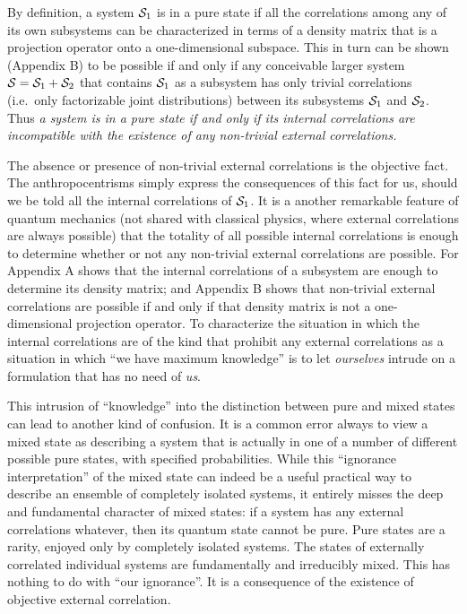 By definition, a system ${\cal S}_1$ is in a pure state if all the
correlations among any of its own subsystems can be characterized in
terms of a density matrix that is a projection operator onto a
one-dimensional subspace.  This in turn can be shown (Appendix B) to
be possible if and only if any conceivable larger system ${\cal S} =
{\cal S}_1 + {\cal S}_2$ that contains ${\cal S}_1$ as a subsystem has only trivial
correlations (i.e.~only factorizable joint distributions) between its
subsystems ${\cal S}_1$ and ${\cal S}_2$.  Thus {\it a system is in a pure state
if and only if its internal correlations are incompatible with the
existence of any non-trivial external correlations.\/} 

The absence or presence of non-trivial external correlations is the
objective fact.  The anthropocentrisms simply express the consequences
of this fact for us, should we be told all the internal correlations
of ${\cal S}_1$.  It is a another remarkable feature of quantum mechanics
(not shared with classical physics, where external correlations are
always possible) that the totality of all possible internal
correlations is enough to determine whether or not any non-trivial
external correlations are possible.  For Appendix A shows that the
internal correlations of a subsystem are enough to determine its
density matrix; and Appendix B shows that non-trivial external
correlations are possible if and only if that density matrix is not a
one-dimensional projection operator.  To characterize the situation
in which the internal correlations are of the kind that prohibit any
external correlations as a situation in which ``we have maximum
knowledge'' is to let {\it ourselves\/} intrude on a formulation that
has no need of {\it us\/}.  

This intrusion of ``knowledge'' into the distinction between pure and
mixed states can lead to another kind of confusion.  It is a common
error always to view a mixed state as describing a system that is
actually in one of a number of different possible pure states, with
specified probabilities.  While this ``ignorance interpretation'' of
the mixed state can indeed be a useful practical way to describe an
ensemble of completely isolated systems, it entirely misses the deep
and fundamental character of mixed states:  if a system has any external
correlations whatever, then its quantum state cannot be pure.  Pure
states are a rarity, enjoyed only by completely isolated systems.  The
states of externally correlated individual systems are fundamentally
and irreducibly mixed.  This has nothing to do with ``our
ignorance''.  It is a consequence of the existence of objective
external correlation.

